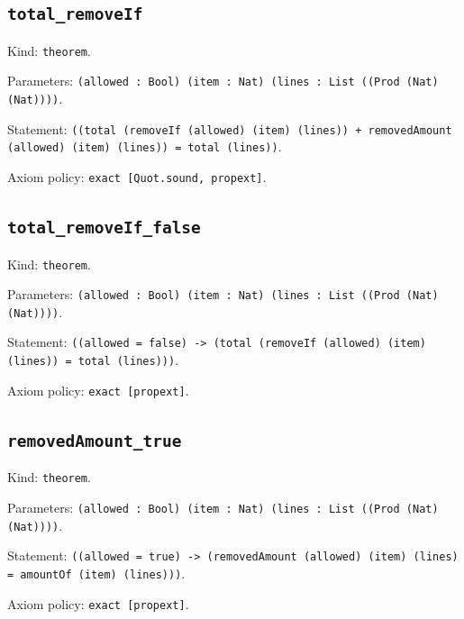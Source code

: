 \documentclass[11pt]{article}
\begin{document}
\subsection*{\texttt{total\_removeIf}}
\noindent Kind: \texttt{theorem}.\par
\noindent Parameters: \texttt{(allowed : Bool) (item : Nat) (lines : List ((Prod (Nat) (Nat))))}.\par
\noindent Statement: \texttt{((total (removeIf (allowed) (item) (lines)) + removedAmount (allowed) (item) (lines)) = total (lines))}.\par
\noindent Axiom policy: \texttt{exact [Quot.sound, propext]}.\par
\subsection*{\texttt{total\_removeIf\_false}}
\noindent Kind: \texttt{theorem}.\par
\noindent Parameters: \texttt{(allowed : Bool) (item : Nat) (lines : List ((Prod (Nat) (Nat))))}.\par
\noindent Statement: \texttt{((allowed = false) -> (total (removeIf (allowed) (item) (lines)) = total (lines)))}.\par
\noindent Axiom policy: \texttt{exact [propext]}.\par
\subsection*{\texttt{removedAmount\_true}}
\noindent Kind: \texttt{theorem}.\par
\noindent Parameters: \texttt{(allowed : Bool) (item : Nat) (lines : List ((Prod (Nat) (Nat))))}.\par
\noindent Statement: \texttt{((allowed = true) -> (removedAmount (allowed) (item) (lines) = amountOf (item) (lines)))}.\par
\noindent Axiom policy: \texttt{exact [propext]}.\par
\end{document}
